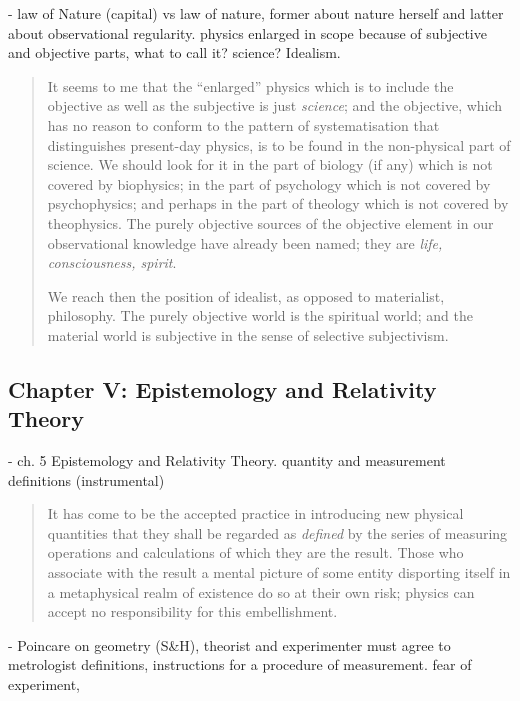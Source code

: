 - law of Nature (capital) vs law of nature, former about nature herself and latter about observational regularity.  physics enlarged in scope because of subjective and objective parts, what to call it?  science?  Idealism.

\begin{quote}
    It seems to me that the ``enlarged'' physics which is to include the objective as well as the subjective is just \emph{science}; and the objective, which has no reason to conform to the pattern of systematisation that distinguishes present-day physics, is to be found in the non-physical part of science.  We should look for it in the part of biology (if any) which is not covered by biophysics; in the part of psychology which is not covered by psychophysics; and perhaps in the part of theology which is not covered by theophysics.  The purely objective sources of the objective element in our observational knowledge have already been named; they are \emph{life, consciousness, spirit}.
    
    We reach then the position of idealist, as opposed to materialist, philosophy.  The purely objective world is the spiritual world; and the material world is subjective in the sense of selective subjectivism.
    
    \citep[p. 68-69]{Eddington1939}
\end{quote}

\subsection{Chapter V: Epistemology and Relativity Theory}
- ch. 5 Epistemology and Relativity Theory.  quantity and measurement definitions (instrumental)

\begin{quote}
    It has come to be the accepted practice in introducing new physical quantities that they shall be regarded as \emph{defined} by the series of measuring operations and calculations of which they are the result.  Those who associate with the result a mental picture of some entity disporting itself in a metaphysical realm of existence do so at their own risk; physics can accept no responsibility for this embellishment.
    
    \citep[p. 71]{Eddington1939}
\end{quote}

- Poincare on geometry (S\&H), theorist and experimenter must agree to  metrologist definitions, instructions for a procedure of measurement.  fear of experiment, 

